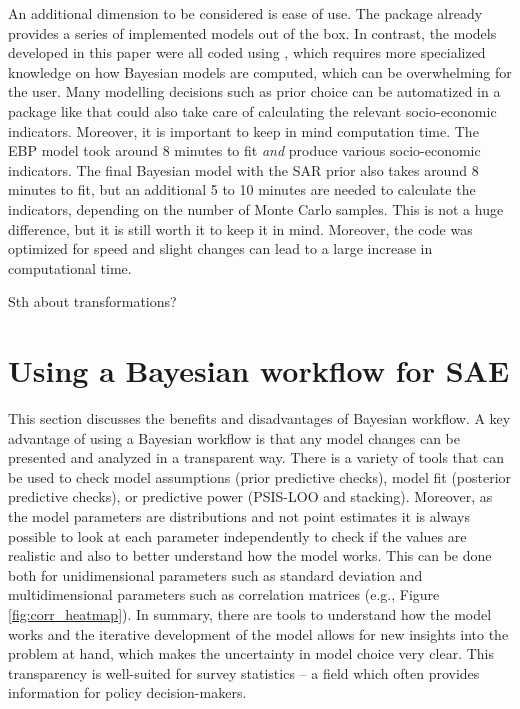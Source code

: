 An additional dimension to be considered is ease of use.
The  package already provides a series of implemented models out of the box.
In contrast, the models developed in this paper were all coded using , which requires more specialized knowledge on how Bayesian models are computed, which can be overwhelming for the user.
Many modelling decisions such as prior choice can be automatized in a package like  that could also take care of calculating the relevant socio-economic indicators.
Moreover, it is important to keep in mind computation time.
The EBP model took around 8 minutes to fit \textit{and} produce various socio-economic indicators.
The final Bayesian model with the SAR prior also takes around 8 minutes to fit, but an additional 5 to 10 minutes are needed to calculate the indicators, depending on the number of Monte Carlo samples.
This is not a huge difference, but it is still worth it to keep it in mind.
Moreover, the  code was optimized for speed and slight changes can lead to a large increase in computational time.


Sth about transformations?


\section{Using a Bayesian workflow for SAE}

This section discusses the benefits and disadvantages of Bayesian workflow.
A key advantage of using a Bayesian workflow is that any model changes can be presented and analyzed in a transparent way.
There is a variety of tools that can be used to check model assumptions (prior predictive checks), model fit (posterior predictive checks), or predictive power (PSIS-LOO and stacking).
Moreover, as the model parameters are distributions and not point estimates it is always possible to look at each parameter independently to check if the values are realistic and also to better understand how the model works.
This can be done both for unidimensional parameters such as standard deviation and multidimensional parameters such as correlation matrices (e.g., Figure \ref{fig:corr_heatmap}).
In summary, there are tools to understand how the model works and the iterative development of the model allows for new insights into the problem at hand, which makes the uncertainty in model choice very clear.
This transparency is well-suited for survey statistics – a field which often provides information for policy decision-makers.

